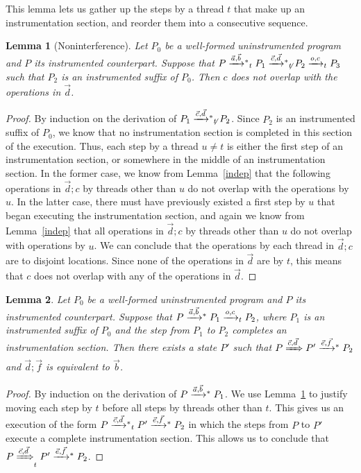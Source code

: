 \documentclass[preprint, 10pt]{sigplanconf}
\newcommand{\tto}[1]{\mathrel{
  \vphantom{\xrightarrow{#1}}
  \smash{\xrightarrow{#1}}
  \vphantom{\to}^{*}}
}
\newtheorem{lemma}{Lemma}
\begin{document}
This lemma lets us gather up the steps by a thread $t$ that make up an instrumentation section, and reorder them into a consecutive sequence.
\begin{lemma}[Noninterference]\label{noninterference}Let $P_0$ be a well-formed uninstrumented program and $P$ its instrumented counterpart. Suppose that $P \tto{\vec{a}, \vec{b}}_t P_1 \tto{\vec{c}, \vec{d}}_{\not t} P_2 \xrightarrow{o, c}_t P_3$ such that $P_2$ is an instrumented suffix of $P_0$. Then $c$ does not overlap with the operations in $\vec{d}$.\end{lemma}
\begin{proof}By induction on the derivation of $P_1 \tto{\vec{c}, \vec{d}}_{\not t} P_2$. Since $P_2$ is an instrumented suffix of $P_0$, we know that no instrumentation section is completed in this section of the execution. Thus, each step by a thread $u \neq t$ is either the first step of an instrumentation section, or somewhere in the middle of an instrumentation section. In the former case, we know from Lemma~\ref{indep} that the following operations in $\vec{d}; c$ by threads other than $u$ do not overlap with the operations by $u$. In the latter case, there must have previously existed a first step by $u$ that began executing the instrumentation section, and again we know from Lemma~\ref{indep} that all operations in $\vec{d}; c$ by threads other than $u$ do not overlap with operations by $u$. We can conclude that the operations by each thread in $\vec{d}; c$ are to disjoint locations. Since none of the operations in $\vec{d}$ are by $t$, this means that $c$ does not overlap with any of the operations in $\vec{d}$.\end{proof}
\begin{lemma}\label{first-finished}Let $P_0$ be a well-formed uninstrumented program and $P$ its instrumented counterpart. Suppose that $P \tto{\vec{a}, \vec{b}} P_1 \xrightarrow{o, c}_t P_2$, where $P_1$ is an instrumented suffix of $P_0$ and the step from $P_1$ to $P_2$ completes an instrumentation section. Then there exists a state $P'$ such that $P \xRightarrow{\vec{c}, \vec{d}} P' \tto{\vec{e}, \vec{f}} P_2$ and $\vec{d}; \vec{f}$ is equivalent to $\vec{b}$.\end{lemma}
\begin{proof}By induction on the derivation of $P \tto{\vec{a}, \vec{b}} P_1$. We use Lemma~\ref{noninterference} to justify moving each step by $t$ before all steps by threads other than $t$. This gives us an execution of the form $P \tto{\vec{c}, \vec{d}}_t P' \tto{\vec{e}, \vec{f}} P_2$ in which the steps from $P$ to $P'$ execute a complete instrumentation section. This allows us to conclude that $P \xRightarrow{\vec{c}, \vec{d}}_t P' \tto{\vec{e}, \vec{f}} P_2$.\end{proof}
\end{document}
